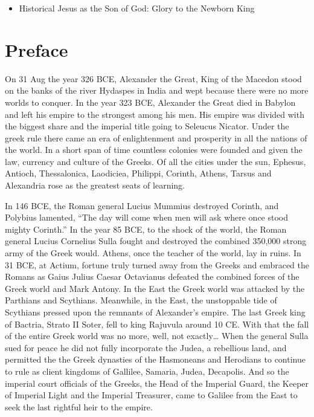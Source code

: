 \begin{itemize}
\item
  Historical Jesus as the Son of God: Glory to the Newborn King
\end{itemize}

\section{Preface}\label{par:preface}

On 31 Aug the year 326 BCE, Alexander the Great, King of the Macedon stood on the banks of the river Hydaspes in India and wept because there were no more worlds to conquer.
In the year 323 BCE, Alexander the Great died in Babylon and left his empire to the strongest among his men.
His empire was divided with the biggest share and the imperial title going to Seleucus Nicator.
Under the greek rule there came an era of enlightenment and prosperity in all the nations of the world.
In a short span of time countless colonies were founded and given the law, currency and culture of the Greeks.
Of all the cities under the sun, Ephesus, Antioch, Thessalonica, Laodiciea, Philippi, Corinth, Athens, Tarsus and Alexandria rose as the greatest seats of learning.

In 146 BCE, the Roman general Lucius Mummius destroyed Corinth, and Polybius lamented, ``The day will come when men will ask where once stood mighty Corinth.'' In the year 85 BCE, to the shock of the world, the Roman general Lucius Cornelius Sulla fought and destroyed the combined 350,000 strong army of the Greek would.
Athens, once the teacher of the world, lay in ruins.
In 31 BCE, at Actium, fortune truly turned away from the Greeks and embraced the Romans as Gaius Julius Caesar Octavianus defeated the combined forces of the Greek world and Mark Antony.
In the East the Greek world was attacked by the Parthians and Scythians.
Meanwhile, in the East, the unstoppable tide of Scythians pressed upon the remnants of Alexander's empire.
The last Greek king of Bactria, Strato II Soter, fell to king Rajuvula around 10 CE.
With that the fall of the entire Greek world was no more, well, not exactly\ldots{} When the general Sulla sued for peace he did not fully incorporate the Judea, a rebellious land, and permitted the the Greek dynasties of the Hasmoneans and Herodians to continue to rule as client kingdoms of Gallilee, Samaria, Judea, Decapolis.
And so the imperial court officials of the Greeks, the Head of the Imperial Guard, the Keeper of Imperial Light and the Imperial Treasurer, came to Galilee from the East to seek the last rightful heir to the empire.

